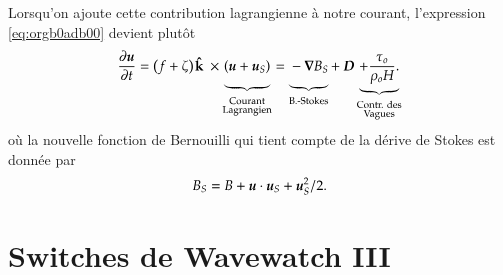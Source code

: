 \documentclass[10pt]{article}
\numberwithin{equation}{section}
\newcommand{\kvf}{\vb{\hat{k}}}
\newcommand{\uu}{\vb*{u}}
\newcommand{\grande}{\vphantom{\frac{1}{xx}}}
\newcommand{\pt}{\hspace{1pt}} %
\begin{document}
Lorsqu'on ajoute cette contribution lagrangienne à notre courant, l'expression \ref{eq:orgb0adb00} devient plutôt
\begin{equation}
   \pdv{\uu}{t} = \qty(f+\zeta)\pt \kvf\ \times\underbrace{\grande\qty(\uu + \uu_S)}_{\substack{\text{Courant} \\ \text{Lagrangien}}} = \underbrace{\grande-\gradient{B_S}}_\text{B.-Stokes} + \ \boldsymbol{D} \underbrace{+ \frac{\tau_o}{\rho_o H}.}_{\substack{\text{Contr. des} \\ \text{Vagues}}}
\end{equation}
où la nouvelle fonction de Bernouilli qui tient compte de la dérive de Stokes est donnée par
\begin{align}
   B_S = B + \uu\cdot\uu_S + \uu_S^2/2.
\end{align}


\section{Switches de Wavewatch III}
\label{sec:orgd97ae52}


\end{document}

